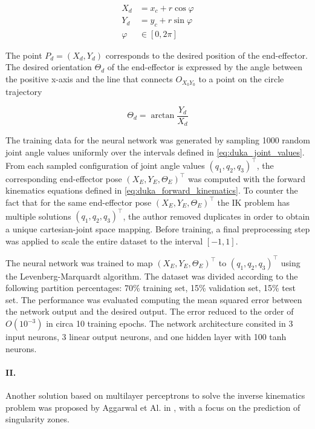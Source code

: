 \documentclass[10pt,a4paper, final]{report} %
\begin{document}
\begin{align}
X_d &= x_c + r \cos \varphi \nonumber\\
Y_d &= y_c + r \sin \varphi\\
\varphi &\in [0, 2 \pi] \nonumber
\end{align}

The point $P_d = (X_d, Y_d)$ corresponds to the desired position of the end-effector.
The desired orientation $\Theta_d$ of the end-effector is expressed by the angle between the positive x-axis and the line that connects $O_{X_0 Y_0}$ to a point on the circle trajectory

\begin{equation}
\Theta_d = \arctan \frac{Y_d}{X_d}
\end{equation}

The training data for the neural network was generated by sampling 1000 random joint angle values uniformly over the intervals defined in \eqref{eq:duka_joint_values}. From each sampled configuration of joint angle values $(q_1, q_2, q_3)^\intercal$, the corresponding end-effector pose $(X_E, Y_E, \Theta_E)^\intercal$ was computed with the forward kinematics equations defined in \eqref{eq:duka_forward_kinematics}. To counter the fact that for the same end-effector pose $(X_E, Y_E, \Theta_E)^\intercal$ the IK problem has multiple solutions $(q_1, q_2, q_3)^\intercal$, the author removed duplicates in order to obtain a unique cartesian-joint space mapping.
Before training, a final preprocessing step was applied to scale the entire dataset to the interval $[-1, 1]$.

The neural network was trained to map $(X_E, Y_E, \Theta_E)^\intercal$ to $(q_1, q_2, q_3)^\intercal$ using the Levenberg-Marquardt algorithm. The dataset was divided according to the following partition percentages: 70\% training set, 15\% validation set, 15\% test set. The performance was evaluated computing the mean squared error between the network output and the desired output. The error reduced to the order of $O(10^{-3})$ in circa 10 training epochs. The network architecture consited in 3 input neurons, 3 linear output neurons, and one hidden layer with 100 tanh neurons.

\paragraph{II.}
Another solution based on multilayer perceptrons to solve the inverse kinematics problem was proposed by Aggarwal et Al. in \cite{aggarwal2014use}, with a focus on the prediction of singularity zones. 
\end{document}
